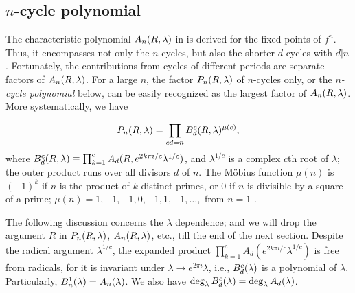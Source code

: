 \documentclass{ws-ijbc}
\begin{document}
\subsection{\label{sec:primfac}$n$-cycle polynomial}


The characteristic polynomial $A_n(R, \lambda)$ in 
  is derived for the fixed points of $f^n$.
Thus, it encompasses not only the $n$-cycles,
  but also the shorter $d$-cycles with $d|n$.
%
Fortunately, the contributions from cycles of different periods
  are separate factors of $A_n(R, \lambda)$.
For a large $n$,
  the factor $P_n(R, \lambda)$ of $n$-cycles only,
  or the \emph{$n$-cycle polynomial} below,
  can be easily recognized
  as the largest factor of $A_n(R, \lambda)$.
%
More systematically, we have


  \begin{equation}
    P_n(R, \lambda)
    = \prod_{cd = n} B_d^c(R, \lambda)^{\mu(c)},
  \label{eq:primfac}
  \end{equation}
where
  $B_d^c(R, \lambda) \equiv \prod_{k=1}^c A_{d}(R, e^{2k\pi i/c} \lambda^{1/c})$,
  and
  $\lambda^{1/c}$ is a complex $c$th root of $\lambda$;
  the outer product runs over all divisors $d$ of $n$.
%
%
%
The M\"obius function $\mu(n)$ is $(-1)^k$
  if $n$ is the product of $k$ distinct primes,
  or 0 if $n$ is divisible by a square of a prime;
$\mu(n) = 1, -1, -1, 0, -1, 1, -1, \ldots,$
  from $n = 1$
 \cite{hardy}.
%



The following discussion concerns the $\lambda$ dependence;
  and we will drop the argument $R$ in $P_n(R, \lambda)$, $A_n(R, \lambda)$, etc.,
  till the end of the next section.
Despite the radical argument $\lambda^{1/c}$,
  the expanded product $\prod_{k=1}^c A_d(e^{2k\pi i/c} \lambda^{1/c})$
  is free from radicals,
  for it is invariant under $\lambda \rightarrow e^{2\pi i} \lambda$,
  i.e., $B_d^c(\lambda)$ is a polynomial of $\lambda$.
Particularly, $B_n^1(\lambda) = A_n(\lambda)$.
We also have $\deg_\lambda B_d^c(\lambda) = \deg_\lambda A_d(\lambda)$.
%
\end{document}
